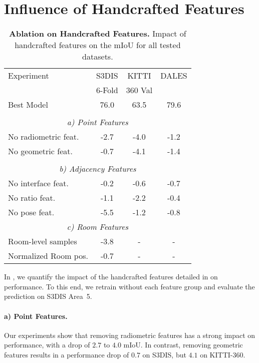\section{Influence of Handcrafted Features}
\label{sec:hfablation}

\begin{table}
\caption{\textbf{Ablation on Handcrafted Features.} Impact of handcrafted features on the mIoU for all tested datasets.}
\label{tab:hfablation}
\centering
\small{
\begin{tabular}{@{}lccc@{}}
    \toprule
    Experiment & S3DIS & KITTI & DALES \\
     & 6-Fold & 360 Val & \\
    \midrule
    Best Model           & 76.0 & 63.5 & 79.6 \\
    \\
    \multicolumn{4}{c}{\textit{a)  Point Features}} \\
    \midrule
    No radiometric feat. & -2.7 & -4.0 & -1.2 \\
    No geometric feat.   & -0.7 & -4.1 & -1.4 \\
    \\
    \multicolumn{4}{c}{\textit{b) Adjacency Features}} \\
    \midrule 
    No interface feat.   & -0.2 & -0.6 & -0.7 \\
    No ratio feat.       & -1.1 & -2.2 & -0.4 \\
    No pose feat.        & -5.5 & -1.2 & -0.8 \\
    \multicolumn{4}{c}{\textit{c) Room Features}} \\
    \midrule
    Room-level samples   & -3.8 & - & - \\
    Normalized Room pos.        & -0.7 & - & - \\   
    \bottomrule
\end{tabular}}
\end{table} 
In , we quantify the impact of the handcrafted features detailed in  on performance. To this end, we retrain \SHORTHAND without each feature group and evaluate the prediction on S3DIS Area~5. 

\paragraph{a) Point Features.} Our experiments show that removing radiometric features has a strong impact on performance, with a drop 
of $2.7$ to $4.0$ mIoU.
In contrast, removing geometric features 
results in a performance drop 
of $0.7$ on S3DIS, but $4.1$ on KITTI-360.

